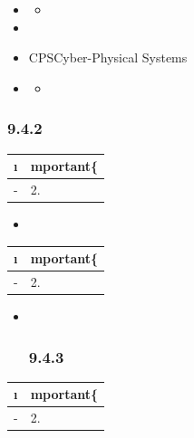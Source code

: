 \important{}

\begin{itemize}
\item
  \begin{itemize}
  \tightlist
  \item
  \end{itemize}
\item
  \important{}
\item
  CPSCyber-Physical Systems
\item
  \begin{itemize}
  \tightlist
  \item
  \end{itemize}
\end{itemize}

\hypertarget{section-14}{%
\subsubsection{9.4.2}\label{section-14}}

\important{}

\begin{longtable}[]{@{}ll@{}}
\toprule\noalign{}
\i & mportant\{} \\
\midrule\noalign{}
\endhead
\bottomrule\noalign{}
\endlastfoot
- & 2. \important{} \\
\end{longtable}

\begin{itemize}
\item
  \important{}
\end{itemize}

\begin{longtable}[]{@{}ll@{}}
\toprule\noalign{}
\i & mportant\{} \\
\midrule\noalign{}
\endhead
\bottomrule\noalign{}
\endlastfoot
- & 2. \important{} \\
\end{longtable}

\begin{itemize}
\item ~
  \hypertarget{section-15}{%
  \subsubsection{9.4.3}\label{section-15}}
\end{itemize}

\important{}

\begin{longtable}[]{@{}ll@{}}
\toprule\noalign{}
\i & mportant\{} \\
\midrule\noalign{}
\endhead
\bottomrule\noalign{}
\endlastfoot
- & 2. \important{} \\
\end{longtable}

